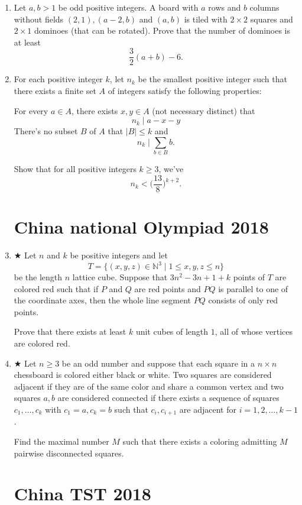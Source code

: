 \documentclass[12pt]{article}
\begin{document}
\begin{enumerate}
		\item Let $a,b>1$ be odd positive integers. A board with $a$ rows and $b$ columns without fields $(2,1),(a-2,b)$ and $(a,b)$ is tiled with $2\times 2$ squares and $2\times 1$ dominoes (that can be rotated). Prove that the number of dominoes is at least $$\frac{3}{2}(a+b)-6.$$
		
		\item For each positive integer $k$, let $n_k$ be the smallest positive integer such that there exists a finite set $A$ of integers satisfy the following properties:
		
		For every $a\in A$, there exists $x,y\in A$ (not necessary distinct) that
		$$n_k\mid a-x-y$$
		There's no subset $B$ of $A$ that $|B|\leq k$ and $$n_k\mid \sum_{b\in B}{b}.$$
		
		Show that for all positive integers $k\geq 3$, we've $$n_k<\Big( \frac{13}{8}\Big)^{k+2}.$$
		
		
		
		
	
		
		\section*{China national Olympiad 2018}
		
		\item $ \bigstar $ Let $n$ and $k$ be positive integers and let
		$$T = \{ (x,y,z) \in \mathbb{N}^3 \mid 1 \leq x,y,z \leq n \}$$be the length $n$ lattice cube. Suppose that $3n^2 - 3n + 1 + k$ points of $T$ are colored red such that if $P$ and $Q$ are red points and $PQ$ is parallel to one of the coordinate axes, then the whole line segment $PQ$ consists of only red points.
		
		Prove that there exists at least $k$ unit cubes of length $1$, all of whose vertices are colored red.
		
		\item $ \bigstar $ Let $n \geq 3$ be an odd number and suppose that each square in a $n \times n$ chessboard is colored either black or white. Two squares are considered adjacent if they are of the same color and share a common vertex and two squares $a,b$ are considered connected if there exists a sequence of squares $c_1,\ldots,c_k$ with $c_1 = a, c_k = b$ such that $c_i, c_{i+1}$ are adjacent for $i=1,2,\ldots,k-1$.
		
		
		Find the maximal number $M$ such that there exists a coloring admitting $M$ pairwise disconnected squares.
		
		\section*{China TST 2018}
		

\end{enumerate}
\end{document}

